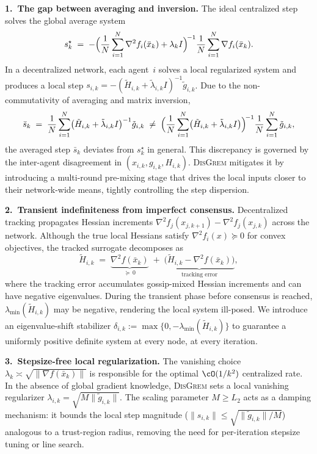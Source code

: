 \documentclass[review,onefignum,onetabnum]{siamart171218}
\begin{document}
	\noindent\textbf{1.\ The gap between averaging and inversion.}
	The ideal centralized step solves the global average system
	\[
	s_k^{\star}
	\;=\;
	-\Bigl(\frac{1}{N}\sum_{i=1}^{N}\nabla^2 f_i(\bar x_k)
	+\lambda_k I\Bigr)^{\!-1}
	\frac{1}{N}\sum_{i=1}^{N}\nabla f_i(\bar x_k).
	\]
	In a decentralized network, each agent~$i$ solves a local regularized
	system and produces a local step
	$s_{i,k}=-(\tilde H_{i,k}+\tilde\lambda_{i,k}I)^{-1}\tilde g_{i,k}$.
	Due to the non-commutativity of averaging and matrix inversion,
	\[
	\bar s_k
	\;=\;
	\frac{1}{N}\sum_{i=1}^{N}
	\bigl(\tilde H_{i,k}+\tilde\lambda_{i,k}I\bigr)^{-1}\tilde g_{i,k}
	\;\neq\;
	\Bigl(\frac{1}{N}\sum_{i=1}^{N}
	\bigl(\tilde H_{i,k}+\tilde\lambda_{i,k}I\bigr)\Bigr)^{\!-1}
	\frac{1}{N}\sum_{i=1}^{N}\tilde g_{i,k},
	\]
	the averaged step $\bar s_k$ deviates from $s_k^{\star}$ in general.
	This discrepancy is governed by the inter-agent disagreement in
	$(x_{i,k},g_{i,k},H_{i,k})$.
	\textsc{DisGrem} mitigates it by introducing a multi-round
	pre-mixing stage that drives the local inputs closer to their
	network-wide means, tightly controlling the step dispersion.
	
	\noindent\textbf{2.\ Transient indefiniteness from imperfect consensus.}
	Decentralized tracking propagates Hessian increments
	$\nabla^2 f_j(x_{j,k+1})-\nabla^2 f_j(x_{j,k})$ across
	the network.
	Although the true local Hessians satisfy $\nabla^2 f_i(x)\succeq 0$
	for convex objectives, the tracked surrogate decomposes as
	\[
	\tilde H_{i,k}
	\;=\;
	\underbrace{\nabla^2 f(\bar x_k)}_{\succeq\,0}
	\;+\;
	\underbrace{\bigl(\tilde H_{i,k}-\nabla^2 f(\bar x_k)\bigr)}_{\text{tracking error}},
	\]
	where the tracking error accumulates gossip-mixed Hessian increments
	and can have negative eigenvalues.
	During the transient phase before consensus is reached,
	$\lambda_{\min}(\tilde H_{i,k})$ may be negative, rendering
	the local system ill-posed.
	We introduce an eigenvalue-shift stabilizer
	$\delta_{i,k}:=\max\{0,-\lambda_{\min}(\tilde H_{i,k})\}$ to
	guarantee a uniformly positive definite system at every node,
	at every iteration.
	
	\noindent\textbf{3.\ Stepsize-free local regularization.}
	The vanishing choice
	$\lambda_k\asymp\sqrt{\|\nabla f(\bar x_k)\|}$ is responsible
	for the optimal $\cO(1/k^2)$ centralized rate.
	In the absence of global gradient knowledge, \textsc{DisGrem}
	sets a local vanishing regularizer
	$\lambda_{i,k}=\sqrt{M\|\tilde g_{i,k}\|}$.
	The scaling parameter $M\ge L_2$ acts as a damping
	mechanism: it bounds the local step magnitude
	($\|s_{i,k}\|\le\sqrt{\|\tilde g_{i,k}\|/M}$) analogous to a
	trust-region radius, removing the need for
	per-iteration stepsize tuning or line search.
	
\end{document}
